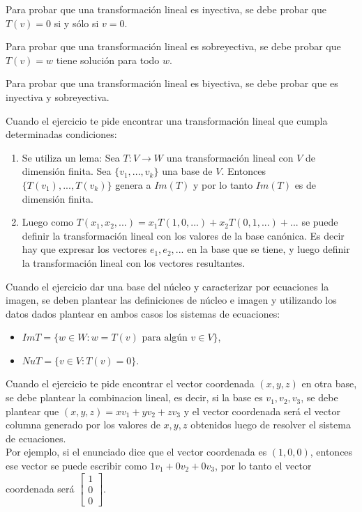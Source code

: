\documentclass[a4,10pt]{aleph-notas}
\begin{document}
\begin{obs}
    Para probar que una transformación lineal es inyectiva, se debe probar que $T(v) = 0$ si y sólo si $v = 0$.
\end{obs}

\begin{obs}
    Para probar que una transformación lineal es sobreyectiva, se debe probar que $T(v) = w$ tiene solución para todo $w$.
\end{obs}

\begin{obs}
    Para probar que una transformación lineal es biyectiva, se debe probar que es inyectiva y sobreyectiva.
\end{obs}

\begin{obs}
    Cuando el ejercicio te pide encontrar una transformación lineal que cumpla determinadas condiciones:
    \begin{enumerate}
        \item Se utiliza un lema: Sea $T:V\to W$ una transformación lineal con $V$ de dimensión finita. Sea $\{ v_1,...,v_k \}$ una base de $V$. Entonces $\{ T(v_1), ... , T(v_k) \}$ genera a $Im(T)$ y por lo tanto $Im(T)$ es de dimensión finita.
        \item Luego como $T(x_1,x_2,...) = x_1T(1,0,...) + x_2T(0,1,...) + ...$ se puede definir la transformación lineal con los valores de la base canónica. Es decir hay que expresar los vectores $e_1,e_2,...$ en la base que se tiene, y luego definir la transformación lineal con los vectores resultantes.
    \end{enumerate}
\end{obs}

\begin{obs}
    Cuando el ejercicio dar una base del núcleo y caracterizar por ecuaciones la imagen, se deben plantear las definiciones de núcleo e imagen y utilizando los datos dados plantear en ambos casos los sistemas de ecuaciones:
    \begin{itemize}
        \item $ImT= \{ w \in W : w = T(v) \text{ para algún } v \in V \}$,
        \item $NuT= \{ v \in V : T(v) = 0 \}$. 
    \end{itemize}
\end{obs}

\begin{obs}
    Cuando el ejercicio te pide encontrar el vector coordenada $(x,y,z)$ en otra base, se debe plantear la combinacion lineal, es decir, si la base es $v_1,v_2,v_3$, se debe plantear que $(x,y,z)= xv_1+yv_2+zv_3$ y el vector coordenada será el vector columna generado por los valores de $x,y,z$ obtenidos luego de resolver el sistema de ecuaciones. \\
    Por ejemplo, si el enunciado dice que el vector coordenada es $(1,0,0)$, entonces ese vector se puede escribir como $1v_1+0v_2+0v_3$, por lo tanto el vector coordenada será $\begin{bmatrix} 1 \\ 0 \\ 0 \end{bmatrix}$.
\end{obs}
\end{document}
